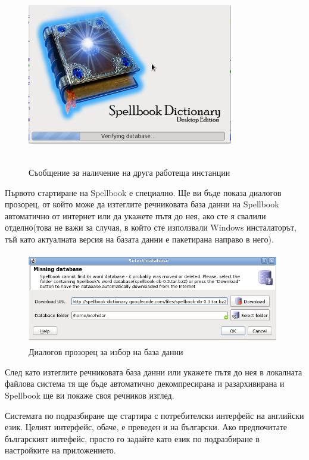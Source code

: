 \begin{figure}[htbp]
  \caption{Съобщение за наличение на друга работеща инстанции}
  \centering
  \includegraphics[width=90mm, height=80mm]{images/splashscreen.png}
\end{figure}

Първото стартиране на Spellbook е специално. Ще ви бъде показа
диалогов прозорец, от който може да изтеглите речниковата база данни
на Spellbook автоматично от интернет или да укажете пътя до нея, ако
сте я свалили отделно(това не важи за случая, в който сте използвали
Windows инсталаторът, тъй като актуалната версия на базата данни е
пакетирана направо в него).
\begin{figure}[htbp]
  \caption{Диалогов прозорец за избор на база данни}
  \centering
  \includegraphics[width=110mm, height=40mm]{images/select_db.png}
\end{figure}

След като изтеглите речниковата база данни или укажете пътя до нея в
локалната файлова система тя ще бъде автоматично декомпресирана и
разархивирана и Spellbook ще ви покаже своя речников изглед.

Системата по подразбиране ще стартира с потребителски интерфейс на
английски език. Целият интерфейс, обаче, е преведен и на
български. Ако предпочитате българският интефейс, просто го задайте
като език по подразбиране в настройките на приложението.

